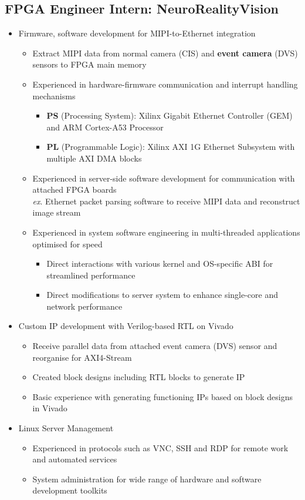 \documentclass[10pt]{article}
\begin{document}
\subsection*{FPGA Engineer Intern: NeuroRealityVision}
\begin{itemize}
  \item Firmware, software development for MIPI-to-Ethernet integration
    \begin{itemize}
      \item Extract MIPI data from normal camera (CIS) and
        \textbf{event camera} (DVS) sensors to FPGA main memory
      \item Experienced in hardware-firmware communication and interrupt
        handling mechanisms
        \begin{itemize}
          \item \textbf{PS} (Processing System): Xilinx Gigabit Ethernet
            Controller (GEM) and ARM Cortex-A53 Processor
          \item \textbf{PL} (Programmable Logic): Xilinx AXI 1G Ethernet
            Subsystem with multiple AXI DMA blocks
        \end{itemize}
      \item Experienced in server-side software development for communication
        with attached FPGA boards \\
        \textit{ex}. Ethernet packet parsing software to receive MIPI data and
          reconstruct image stream
      \item Experienced in system software engineering in multi-threaded
        applications optimised for speed
        \begin{itemize}
          \item Direct interactions with various kernel and OS-specific ABI
            for streamlined performance
          \item Direct modifications to server system to enhance single-core
            and network performance
        \end{itemize}
    \end{itemize}
  \item Custom IP development with Verilog-based RTL on Vivado
    \begin{itemize}
      \item Receive parallel data from attached event camera (DVS) sensor and
        reorganise for AXI4-Stream
      \item Created block designs including RTL blocks to generate IP
      \item Basic experience with generating functioning IPs based on block
        designs in Vivado
    \end{itemize}
  \item Linux Server Management
    \begin{itemize}
      \item Experienced in protocols such as VNC, SSH and RDP for remote work
        and automated services
      \item System administration for wide range of hardware and software
        development toolkits
    \end{itemize}
\end{itemize}
\end{document}
